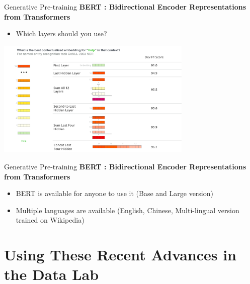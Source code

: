 \documentclass[aspectratio=169]{beamer}
\begin{document}
\begin{frame}{Generative Pre-training}
\centering
\textbf{BERT : Bidirectional Encoder Representations from Transformers \cite{devlin2018bert}}

\begin{itemize}
	\item Which layers should you use?
\end{itemize}

\includegraphics[width=0.7\textwidth]{figures/bert-feature-extraction-contextualized-embeddings}
\end{frame}

\begin{frame}{Generative Pre-training}
\centering
\textbf{BERT : Bidirectional Encoder Representations from Transformers \cite{devlin2018bert}}

\begin{itemize}
	\item BERT is available for anyone to use it (Base and Large version)
	\item Multiple languages are available (English, Chinese, Multi-lingual version trained on Wikipedia)
\end{itemize}

\end{frame}


\section{Using These Recent Advances in the Data Lab}
\end{document}
